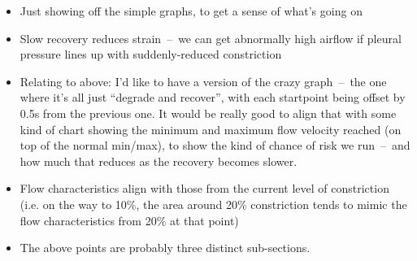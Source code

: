 \begin{itemize}
        \begin{itemize}
            \item Just showing off the simple graphs, to get a sense of what's going on
            \item Slow recovery reduces strain~--~we can get abnormally high airflow if pleural
                pressure lines up with suddenly-reduced constriction 
            \item Relating to above: I'd like to have a version of the crazy graph~--~the one
                where it's all just ``degrade and recover'', with each startpoint being offset
                by 0.5s from the previous one. It would be really good to align that with some
                kind of chart showing the minimum and maximum flow velocity reached (on top of
                the normal min/max), to show the kind of chance of risk we run~--~and how much
                that reduces as the recovery becomes slower.
            \item Flow characteristics align with those from the current level of constriction
                (i.e. on the way to 10\%, the area around 20\% constriction tends to mimic the
                flow characteristics from 20\% at that point)
            \item The above points are probably three distinct sub-sections.
        \end{itemize}
\end{itemize}
